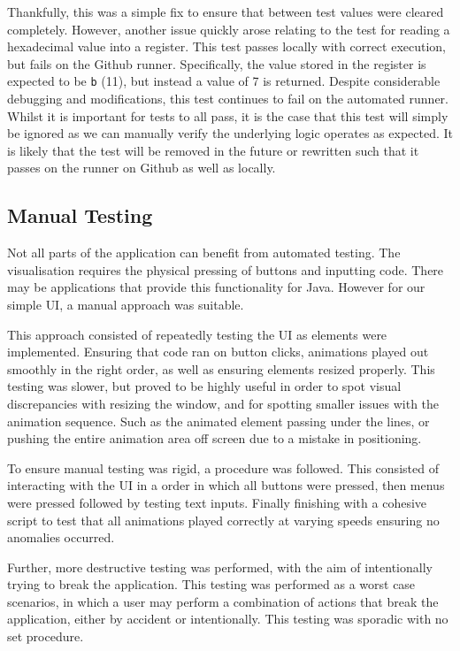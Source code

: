 Thankfully, this was a simple fix to ensure that between test values were cleared completely. However, another issue quickly arose relating to the test for reading a hexadecimal value into a register. This test passes locally with correct execution, but fails on the Github runner. Specifically, the value stored in the register is expected to be \texttt{b} (11), but instead a value of 7 is returned. Despite considerable debugging and modifications, this test continues to fail on the automated runner. Whilst it is important for tests to all pass, it is the case that this test will simply be ignored as we can manually verify the underlying logic operates as expected. It is likely that the test will be removed in the future or rewritten such that it passes on the runner on Github as well as locally.

\subsection{Manual Testing}
Not all parts of the application can benefit from automated testing. The visualisation requires the physical pressing of buttons and inputting code. There may be applications that provide this functionality for Java. However for our simple \ac{UI}, a manual approach was suitable.

This approach consisted of repeatedly testing the \ac{UI} as elements were implemented. Ensuring that code ran on button clicks, animations played out smoothly in the right order, as well as ensuring elements resized properly. This testing was slower, but proved to be highly useful in order to spot visual discrepancies with resizing the window, and for spotting smaller issues with the animation sequence. Such as the animated element passing under the lines, or pushing the entire animation area off screen due to a mistake in positioning.

To ensure manual testing was rigid, a procedure was followed. This consisted of interacting with the \ac{UI} in a order in which all buttons were pressed, then menus were pressed followed by testing text inputs. Finally finishing with a cohesive script to test that all animations played correctly at varying speeds ensuring no anomalies occurred.

Further, more destructive testing was performed, with the aim of intentionally trying to break the application. This testing was performed as a worst case scenarios, in which a user may perform a combination of actions that break the application, either by accident or intentionally. This testing was sporadic with no set procedure. 

